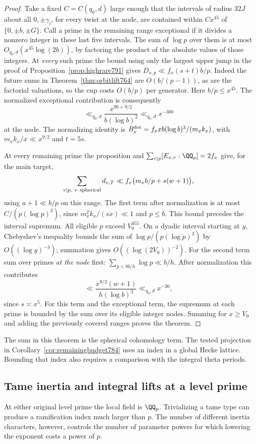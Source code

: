\documentclass[a4paper,11pt]{article}
\theoremstyle{definition}
\theoremstyle{remark}
\numberwithin{equation}{section}
\begin{document}
\begin{proof}
Take a fixed \(C=C(q_0,d)\) large enough that the intervals
of radius \(32J\) about all \(0,\pm\gamma_i\), for every
twist at the node, are contained within \(C x^{45}\) of
\(\{0,\pm b,\pm G\}\). Call a prime in the remaining
range exceptional if it divides a nonzero integer in
these last five intervals. The sum of \(\log p\) over
them is at most \(O_{q_0,d}(x^{45}\log(2b))\), by factoring
the product of the absolute values of those integers.
At \emph{every} such prime the bound using only the largest
upper jump in the proof of Proposition~\ref{prop:highrare791}
gives \(D_{x,p}\ll f_x(s+t)b/p\). Indeed the future sums
in Theorem~\ref{thm:orbitlift764} are \(O(b/(p-1))\), as
are the factorial valuations, so the cup costs \(O(b/p)\)
per generator. Here \(b/p\le x^{45}\). The normalized
exceptional contribution is consequently
\[
    \ll_{q_0,d} \frac{x^{90+9/2}}{b(\log b)^2}
         \ll_{q_0,d}x^{-300}
\]
at the node. The normalizing identity is
\(B_x^{\rm det}=f_x x b(\log b)^3/(m_x k_x)\), with
\(m_x k_x/x\ll x^{9/2}\) and \(t=5s\).

At every remaining prime the proposition and
\(\sum_{v\mid p}[E_{x,v}:\QQ_p]=2f_x\) give, for
the main target,
\[
       \sum_{v\mid p,\ v\ {\rm spherical}} d_{v,T}
               \ll f_x\bigl(m_x b/p+s(w+1)\bigr),
\]
using \(a+1\ll b/p\) on this range. The first term after
normalization is at most
\(C/(p(\log p)^3)\), since \(m_x^2k_x/(sx)\ll1\)
and \(p\le b\). This bound precedes the interval supremum.
All eligible \(p\) exceed \(V_0^{355}\). On a dyadic
interval starting at \(y\), Chebyshev's inequality bounds
the sum of \(\log p/(p(\log p)^3)\) by
\(O((\log y)^{-3})\); summation gives
\(O((\log(2V_0))^{-2})\).
For the second term sum over primes \emph{at the node}
first: \(\sum_{p<8b/h}\log p\ll b/h\).
After normalization this contributes
\[
          \ll\frac{x^{9/2}(w+1)}{h(\log b)^3}
                 \ll_{q_0,d} x^{-30},
\]
since \(s\asymp x^5\). For this term and the exceptional
term, the supremum at each prime is bounded by the sum
over its eligible integer nodes. Summing for \(x\ge V_0\)
and adding the previously covered ranges proves the theorem.
\end{proof}
The sum in this theorem is the spherical cohomology term.
The tested projection in Corollary~\ref{cor:remainingbudget784}
uses an index in a global Hecke lattice. Bounding that index
also requires a comparison with the integral theta periods.
\clearpage

\subsection{Tame inertia and integral lifts at a level prime}
\label{sec:tametests800}
At either original level prime the local field is \(\QQ_p\).
Trivializing a tame type can produce a ramification index
much larger than \(p\). The number of different inertia
characters, however, controls the number of parameter powers
for which lowering the exponent costs a power of \(p\).
\end{document}
